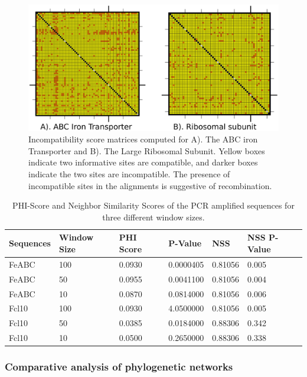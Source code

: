 \begin{figure}
\centering
\includegraphics{Figures/Fcylindrus/matrices.pdf}
\caption{Incompatibility score matrices computed for A). The ABC iron Transporter and B). The Large Ribosomal Subunit.
Yellow boxes indicate two informative sites are compatible, and darker boxes indicate the two sites are incompatible.
The presence of incompatible sites in the alignments is suggestive of recombination.\label{fig:FC_Res_2}}
\end{figure}

\begin{table}
\centering
\caption{PHI-Score and Neighbor Similarity Scores of the PCR amplified sequences for three different window sizes.}
\begin{tabular}{ |P{2cm}|P{2cm}|P{2cm}|P{2cm}|P{2cm}|P{2cm}| }
 \hline
 Sequences & Window Size & PHI Score & P-Value & NSS & NSS P-Value \\
 \hline
 FeABC & 100 & 0.0930 & 0.0000405 & 0.81056 & 0.005 \\
 FeABC & 50 & 0.0955 & 0.0041100 & 0.81056 & 0.004 \\
 FeABC & 10 & 0.0870 & 0.0814000 & 0.81056 & 0.006 \\
 Fcl10 & 100 & 0.0930 & 4.0500000 & 0.81056 & 0.005 \\
 Fcl10 & 50 & 0.0385 & 0.0184000 & 0.88306 & 0.342 \\
 Fcl10 & 10 & 0.0500 & 0.2650000 & 0.88306 & 0.338 \\
 \hline
\end{tabular}
\label{table:Phitable}
\end{table}

\subsubsection{Comparative analysis of phylogenetic networks}


